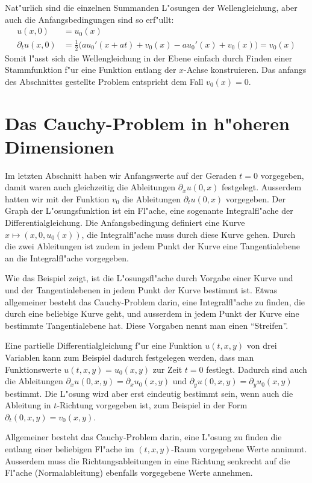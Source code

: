 Nat"urlich sind die einzelnen Summanden L"osungen der Wellengleichung, aber auch
die Anfangsbedingungen sind so erf"ullt:
\begin{align*}
u(x,0)&=u_0(x)\\
\partial_tu(x,0)&=\frac12\bigl(au_0'(x+at)+v_0(x)-au_0'(x)+v_0(x)\bigr) =v_0(x)
\end{align*}
Somit l"asst sich die Wellengleichung in der Ebene einfach durch Finden einer
Stammfunktion f"ur eine Funktion entlang der $x$-Achse konstruieren.
Das anfangs des Abschnittes
gestellte Problem entspricht dem Fall $v_0(x)=0$.

\section{Das Cauchy-Problem in h"oheren Dimensionen}
Im letzten Abschnitt haben wir Anfangswerte auf der Geraden $t=0$
vorgegeben, damit waren auch gleichzeitig die Ableitungen 
$\partial_x u(0,x)$ festgelegt. Ausserdem hatten wir mit der Funktion $v_0$
die Ableitungen $\partial_t u(0,x)$ vorgegeben.
Der Graph der L"osungsfunktion ist ein Fl"ache, eine sogenante
Integralfl"ache der Differentialgleichung. Die Anfangsbedingung
definiert eine Kurve $x\mapsto(x,0,u_0(x))$, die Integralfl"ache muss
durch diese Kurve gehen.
Durch die zwei Ableitungen ist zudem in jedem Punkt der Kurve
eine Tangentialebene an die Integralfl"ache vorgegeben.

Wie das Beispiel zeigt, ist die L"osungsfl"ache durch Vorgabe einer Kurve und
und der Tangentialebenen in jedem Punkt der Kurve bestimmt ist.
Etwas allgemeiner besteht das Cauchy-Problem darin, eine Integralfl"ache
zu finden, die durch eine beliebige Kurve geht, und ausserdem in jedem Punkt
der Kurve eine bestimmte Tangentialebene hat. Diese Vorgaben nennt man
einen ``Streifen''.

Eine partielle Differentialgleichung f"ur eine Funktion $u(t,x,y)$
von drei Variablen kann zum Beispiel dadurch festgelegen werden,
dass man Funktionswerte $u(t,x,y)=u_0(x,y)$ zur Zeit $t=0$ festlegt.
Dadurch sind auch die Ableitungen $\partial_x u(0,x,y)=\partial_xu_0(x,y)$
und $\partial_y u(0,x,y)=\partial_y u_0(x,y)$ bestimmt. Die L"osung wird
aber erst eindeutig bestimmt sein, wenn auch die Ableitung in $t$-Richtung
vorgegeben ist, zum Beispiel in der Form $\partial_t(0,x,y)=v_0(x,y)$.

Allgemeiner besteht das Cauchy-Problem darin, eine L"osung zu finden
die entlang einer beliebigen Fl"ache im $(t,x,y)$-Raum vorgegebene
Werte annimmt. Ausserdem muss die Richtungsableitungen in eine Richtung
senkrecht auf die Fl"ache (Normalableitung) ebenfalls vorgegebene Werte annehmen.


